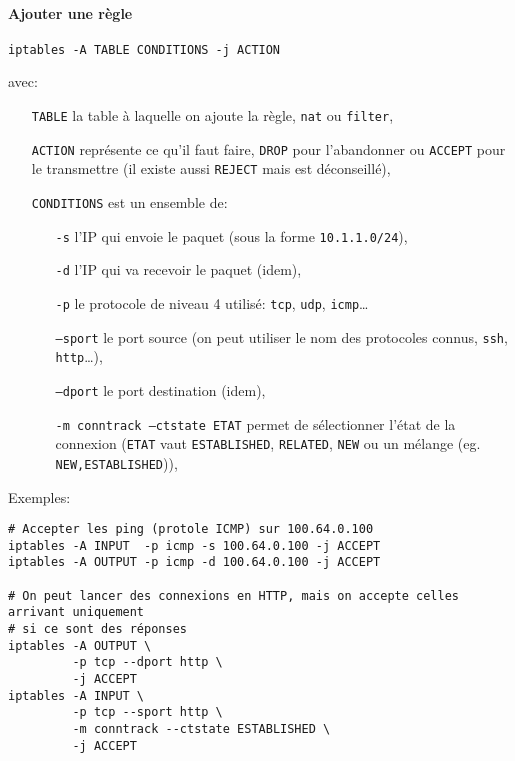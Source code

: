 \documentclass[10pt,a4paper,french]{article}
\begin{document}
\paragraph{Ajouter une règle}
\begin{verbatim}
iptables -A TABLE CONDITIONS -j ACTION
\end{verbatim}
avec:
\begin{itemize}
\item[\tt TABLE] la table à laquelle on ajoute la règle, {\tt nat} ou {\tt filter},
\item[\tt ACTION] représente ce qu'il faut faire, {\tt DROP} pour l'abandonner ou {\tt ACCEPT} pour le transmettre (il existe aussi {\tt REJECT} mais est déconseillé),
\item[\tt CONDITIONS] est un ensemble de:
\begin{itemize}
\item[\tt -s] l'IP qui envoie le paquet (sous la forme {\tt 10.1.1.0/24}),
\item[\tt -d] l'IP qui va recevoir le paquet (idem),
\item[\tt -p] le protocole de niveau 4 utilisé: {\tt tcp}, {\tt udp}, {\tt icmp}\ldots
\item[\tt --sport] le port source (on peut utiliser le nom des protocoles connus, {\tt ssh}, {\tt http}\ldots),
\item[\tt --dport] le port destination (idem),
\item[\tt -m conntrack --ctstate ETAT] permet de sélectionner l'état de la connexion ({\tt ETAT} vaut {\tt ESTABLISHED}, {\tt RELATED}, {\tt NEW} ou un mélange (eg. {\tt NEW,ESTABLISHED})),
\end{itemize}
\end{itemize}
Exemples:
\begin{verbatim}
# Accepter les ping (protole ICMP) sur 100.64.0.100
iptables -A INPUT  -p icmp -s 100.64.0.100 -j ACCEPT
iptables -A OUTPUT -p icmp -d 100.64.0.100 -j ACCEPT

# On peut lancer des connexions en HTTP, mais on accepte celles arrivant uniquement
# si ce sont des réponses
iptables -A OUTPUT \
         -p tcp --dport http \
         -j ACCEPT
iptables -A INPUT \
         -p tcp --sport http \
         -m conntrack --ctstate ESTABLISHED \
         -j ACCEPT
\end{verbatim}
\end{document}

